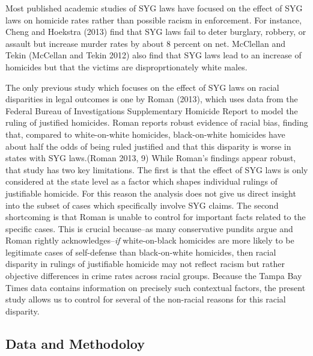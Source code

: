 \documentclass[12pt,article]{article}
\begin{document}
Most published academic studies of SYG laws have focused on the effect
of SYG laws on homicide rates rather than possible racism in
enforcement. For instance, Cheng and Hoekstra (2013) find that SYG laws
fail to deter burglary, robbery, or assault but increase murder rates by
about 8 percent on net. McClellan and Tekin (McCellan and Tekin 2012)
also find that SYG laws lead to an increase of homicides but that the
victims are disproprtionately white males.

The only previous study which focuses on the effect of SYG laws on
racial disparities in legal outcomes is one by Roman (2013), which uses
data from the Federal Bureau of Investigations Supplementary Homicide
Report to model the ruling of justified homicides. Roman reports robust
evidence of racial bias, finding that, compared to white-on-white
homicides, black-on-white homicides have about half the odds of being
ruled justified and that this disparity is worse in states with SYG
laws.(Roman 2013, 9) While Roman's findings appear robust, that study
has two key limitations. The first is that the effect of SYG laws is
only considered at the state level as a factor which shapes individual
rulings of justifiable homicide. For this reason the analysis does not
give us direct insight into the subset of cases which specifically
involve SYG claims. The second shortcoming is that Roman is unable to
control for important facts related to the specific cases. This is
crucial because--as many conservative pundits argue and Roman rightly
acknowledges--\emph{if} white-on-black homicides are more likely to be
legitimate cases of self-defense than black-on-white homicides, then
racial disparity in rulings of justifiable homicide may not reflect
racism but rather objective differences in crime rates across racial
groups. Because the Tampa Bay Times data contains information on
precisely such contextual factors, the present study allows us to
control for several of the non-racial reasons for this racial disparity.

\subsection{Data and Methodoloy}\label{data-and-methodoloy}
\end{document}
